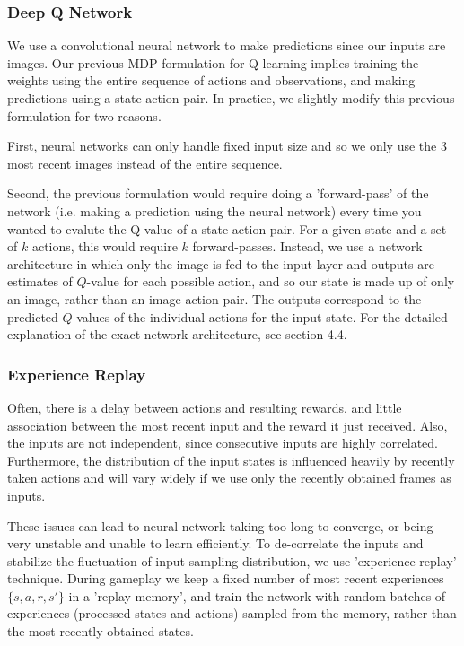 \documentclass{article}
\begin{document}
\begin{multicols}{2}
\subsubsection{Deep Q Network}

We use a convolutional neural network to make predictions since our inputs are images. Our previous MDP formulation for Q-learning implies training the weights using the entire sequence of actions and observations, and making predictions using a state-action pair.
In practice, we slightly modify this previous formulation for two reasons.

First, neural networks can only handle fixed input size and so we only use the 3 most recent images instead of the entire sequence.

Second, the previous formulation would require doing a 'forward-pass' of the network (i.e. making a prediction using the neural network) every time you wanted to evalute the Q-value of a state-action pair. For a given state and a set of $k$ actions, this would require $k$ forward-passes.
Instead, we use a network architecture in which only the image is fed to the input layer and outputs are estimates of $Q$-value for each possible action, and so our state is made up of only an image, rather than an image-action pair. The outputs correspond to the predicted $Q$-values of the individual actions for the input state. For the detailed explanation of the exact network architecture, see section 4.4.

\subsubsection{Experience Replay}

Often, there is a delay between actions and resulting rewards, and little association between the most recent input and the reward it just received. Also, the inputs are not independent, since consecutive inputs are highly correlated. Furthermore, the distribution of the input states is influenced heavily by recently taken actions and will vary widely if we use only the recently obtained frames as inputs.

These issues can lead to neural network taking too long to converge, or being very unstable and unable to learn efficiently. To de-correlate the inputs and stabilize the fluctuation of input sampling distribution, we use 'experience replay' technique. During gameplay we keep a fixed number of most recent experiences $\{s, a, r, s'\}$ in a 'replay memory', and train the network with random batches of experiences (processed states and actions) sampled from the memory, rather than the most recently obtained states.


\end{multicols}
\end{document}
